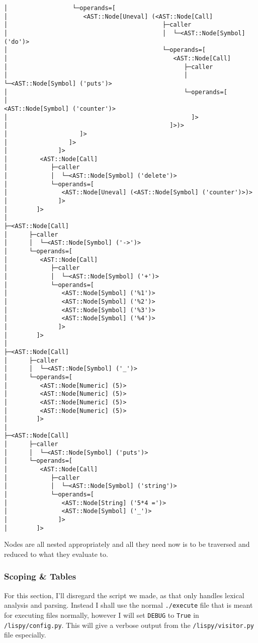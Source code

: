 \documentclass{article}
\newcommand{\code}[1]{\texttt{#1}}
\begin{document}
\begin{Verbatim}[baselinestretch=0.75]
│                  └─operands=[
│                     <AST::Node[Uneval] (<AST::Node[Call]
│                                           ├─caller
│                                           │  └─<AST::Node[Symbol] ('do')>
│                                           └─operands=[
│                                              <AST::Node[Call]
│                                                 ├─caller
│                                                 │  └─<AST::Node[Symbol] ('puts')>
│                                                 └─operands=[
│                                                    <AST::Node[Symbol] ('counter')>
│                                                   ]>
│                                             ]>)>
│                    ]>
│                 ]>
│              ]>
│         <AST::Node[Call]
│            ├─caller
│            │  └─<AST::Node[Symbol] ('delete')>
│            └─operands=[
│               <AST::Node[Uneval] (<AST::Node[Symbol] ('counter')>)>
│              ]>
│        ]>
│
├─<AST::Node[Call]
│      ├─caller
│      │  └─<AST::Node[Symbol] ('->')>
│      └─operands=[
│         <AST::Node[Call]
│            ├─caller
│            │  └─<AST::Node[Symbol] ('+')>
│            └─operands=[
│               <AST::Node[Symbol] ('%1')>
│               <AST::Node[Symbol] ('%2')>
│               <AST::Node[Symbol] ('%3')>
│               <AST::Node[Symbol] ('%4')>
│              ]>
│        ]>
│
├─<AST::Node[Call]
│      ├─caller
│      │  └─<AST::Node[Symbol] ('_')>
│      └─operands=[
│         <AST::Node[Numeric] (5)>
│         <AST::Node[Numeric] (5)>
│         <AST::Node[Numeric] (5)>
│         <AST::Node[Numeric] (5)>
│        ]>
│
├─<AST::Node[Call]
│      ├─caller
│      │  └─<AST::Node[Symbol] ('puts')>
│      └─operands=[
│         <AST::Node[Call]
│            ├─caller
│            │  └─<AST::Node[Symbol] ('string')>
│            └─operands=[
│               <AST::Node[String] ('5*4 =')>
│               <AST::Node[Symbol] ('_')>
│              ]>
│        ]>

\end{Verbatim}

    Nodes are all nested appropriately and all they need now is
    to be traversed and reduced to what they evaluate to.

    \subsubsection{Scoping \& Tables}
    For this section, I'll disregard the script we made, as that only handles
    lexical analysis and parsing. Instead I shall use the normal \code{./execute}
    file that is meant for executing files normally, however I will set
    \code{DEBUG} to \code{True} in \code{/lispy/config.py}. This will give a verbose
    output from the \code{/lispy/visitor.py} file especially.
\end{document}
